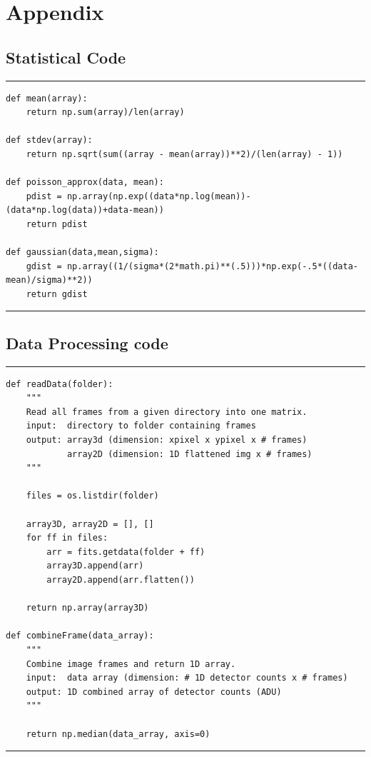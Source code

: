 \documentclass[preprint]{aastex62}
\begin{document}
\newpage
\section{Appendix}


\subsection{Statistical Code} \label{code:stats}
\small
\hrule
\begin{lstlisting}
def mean(array):
    return np.sum(array)/len(array)

def stdev(array):
    return np.sqrt(sum((array - mean(array))**2)/(len(array) - 1))

def poisson_approx(data, mean):
    pdist = np.array(np.exp((data*np.log(mean))-(data*np.log(data))+data-mean))
    return pdist

def gaussian(data,mean,sigma):
    gdist = np.array((1/(sigma*(2*math.pi)**(.5)))*np.exp(-.5*((data-mean)/sigma)**2)) 
    return gdist
\end{lstlisting}
\hrule \vspace{7pt}

\subsection{Data Processing code} \label{code:data} 
\hrule
\begin{lstlisting}
def readData(folder):
    """
    Read all frames from a given directory into one matrix.
    input:  directory to folder containing frames
    output: array3d (dimension: xpixel x ypixel x # frames)
            array2D (dimension: 1D flattened img x # frames)
    """
    
    files = os.listdir(folder)

    array3D, array2D = [], []
    for ff in files:
        arr = fits.getdata(folder + ff)
        array3D.append(arr)
        array2D.append(arr.flatten())
    
    return np.array(array3D)

def combineFrame(data_array):
    """
    Combine image frames and return 1D array.
    input:  data array (dimension: # 1D detector counts x # frames)
    output: 1D combined array of detector counts (ADU)
    """
    
    return np.median(data_array, axis=0)
\end{lstlisting}
\hrule \vspace{7pt}
\end{document}

